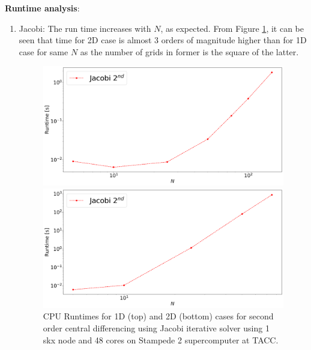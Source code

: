 \documentclass[12pt]{amsart}   %
\begin{document}
\textbf{Runtime analysis}:
\begin{enumerate}
    \item Jacobi:
The run time increases with $N$, as expected. From Figure \ref{fig:runtimejacobi}, it can be seen that time for 2D case is almost 3 orders of magnitude higher than for 1D case for same $N$ as the number of grids in former is the square of the latter.

\begin{figure}[htbp!] 
\begin{minipage}[]{\linewidth}
  \centering
    \includegraphics[width=\linewidth,keepaspectratio]{Project1photos/runtime_Jacobi_1D.png}
\end{minipage}
\begin{minipage}[htbp!]{\linewidth}
  \centering
    \includegraphics[width=\linewidth,keepaspectratio, trim = 0cm 0cm 0cm 0cm,clip]{Project1photos/runtime_Jacobi_2D.png}
\end{minipage}
\caption{CPU Runtimes for 1D (top) and 2D (bottom) cases for second order central differencing using Jacobi iterative solver using 1 skx node and 48 cores on Stampede 2 supercomputer at TACC.} \label{fig:runtimejacobi}
\end{figure}
    

\end{enumerate}
\end{document}
